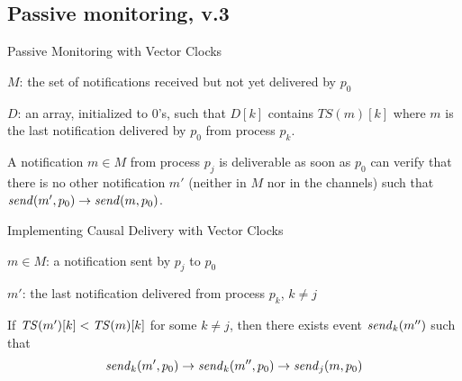 % 
% 
% 
%  
% 

\subsection{Passive monitoring, v.3}





\begin{frame}{Passive Monitoring with Vector Clocks}
	

\BI
\item $M$: the set of notifications received but not yet delivered by $p_0$
\item $D$: an array, initialized to 0's, such that $D[k]$ contains $TS(m)[k]$ where $m$
  is the last notification delivered by $p_0$ from process $p_k$.
\EI

\bigskip
{}

A notification  $m \in M$ from process $p_j$ is deliverable as soon as $p_0$
can verify that there is no other notification  $m'$ (neither in $M$ nor in the 
channels) such that $\mathit{send}(m',p_0) \rightarrow \mathit{send}(m,p_0)$.

\end{frame}


\begin{frame}{Implementing Causal Delivery with Vector Clocks}

\BI
\item $m \in M$: a notification sent by $p_j$ to $p_0$
\item $m'$: the last notification  delivered from process $p_k$, $k \neq j$
\EI

\bigskip
\begin{definition}
If $\mathit{TS}(m')[k] < \mathit{TS}(m)[k]$ for some $k \neq j$, then there exists event $\mathit{send}_k(m'')$ such that
\[
  \mathit{send}_k(m',p_0) \rightarrow \mathit{send}_k(m'',p_0) \rightarrow \mathit{send}_j(m,p_0)
\]
\end{definition}

\bigskip
\end{frame}

